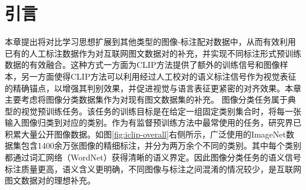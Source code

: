 \section{引言}
\label{sec:iclip-intro}
本章提出将对比学习思想扩展到其他类型的图像-标注配对数据中，从而有效利用已有的人工标注数据作为对互联网图文数据对的补充，并实现不同标注形式预训练数据的有效融合。这种方式一方面为CLIP方法提供了额外的训练信号和图像样本，另一方面使得CLIP方法可以利用经过人工校对的语义标注信号作为视觉表征的精确锚点，以增强其判别效果，并促进视觉与语言表征更紧密的对齐效果。本章主要考虑将图像分类数据集作为对现有图文数据集的补充。
图像分类任务属于典型的视觉预训练任务。该任务的训练目标是在给定一组固定类别集合时，将每一张输入图像归类到对应的类别。作为有监督预训练方法中最常使用的任务，研究界已积累大量公开图像数据。如图\ref{fig:iclip-overall}右侧所示，广泛使用的ImageNet数据集\cite{deng2009imagenet}包含1400余万张图像的精细标注，并分为两万余个不同的类别。其中每个类别都通过词汇网络\cite{miller1995wordnet}（WordNet）获得清晰的语义界定。因此图像分类任务的语义信号标注质量更高，语义含义更明确，不同图像与标注之间混淆的情况较少，是互联网图文数据对的理想补充。


